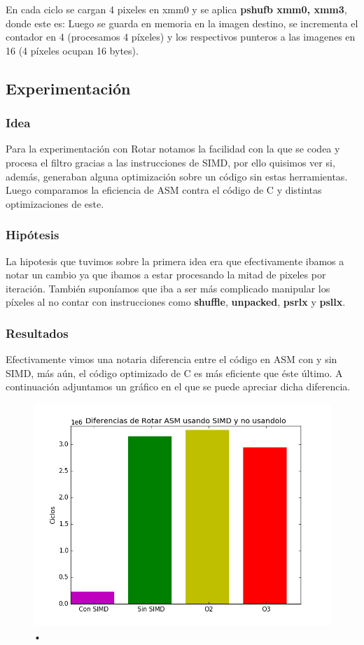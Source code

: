 En cada ciclo se cargan 4 pixeles en xmm0 y se aplica \textbf{pshufb xmm0, xmm3}, donde este es:
Luego se guarda en memoria en la imagen destino, se incrementa el contador en 4 (procesamos 4 píxeles) y los respectivos punteros a las imagenes en 16 (4 píxeles ocupan 16 bytes).	
	
	
\subsection{Experimentación}
\subsubsection{Idea}	


Para la experimentación con Rotar notamos la facilidad con la que se codea y procesa el filtro gracias a las instrucciones de SIMD, por ello quisimos ver si, además, generaban alguna optimización sobre un código sin estas herramientas.
Luego comparamos la eficiencia de ASM contra el código de C y distintas optimizaciones de este.
\subsubsection{Hipótesis}
La hipotesis que tuvimos sobre la primera idea era que efectivamente ibamos a notar un cambio ya que ibamos a estar procesando la mitad de pixeles por iteración. También suponíamos que iba a ser más complicado manipular los píxeles al no contar con instrucciones como \textbf{shuffle}, \textbf{unpacked}, \textbf{psrlx} y \textbf{psllx}.
	
\subsubsection{Resultados}
	Efectivamente vimos una notaria diferencia entre el código en ASM con y sin SIMD, más aún, el código optimizado de C es más eficiente que éste último.
	A continuación adjuntamos un gráfico en el que se puede apreciar dicha diferencia.
	
\begin{figure}[h!]
	\includegraphics[width = 15 cm, height = 10 cm]{imagenes/SinSIMD.png}
\caption{•}
\end{figure}

